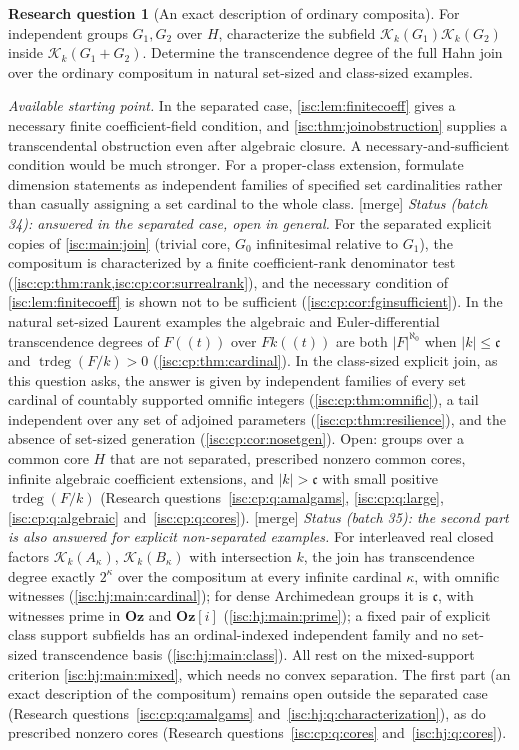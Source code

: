 \documentclass[11pt,letterpaper]{article}
\theoremstyle{definition}
\newtheorem{question}{Research question}
\theoremstyle{remark}
\newcommand{\Oz}{\mathbf{Oz}}
\newcommand{\K}[2]{\mathcal K_{#1}(#2)}
\newcommand{\trdeg}{\operatorname{trdeg}}
\newcommand{\mtag}{\textup{[merge]}}%
\newcommand{\cc}{\mathfrak c}
\numberwithin{equation}{section}
\begin{document}
\begin{question}[An exact description of ordinary composita]
For independent groups $G_1,G_2$ over $H$, characterize the subfield
$\K{k}{G_1}\K{k}{G_2}$ inside $\K{k}{G_1+G_2}$. Determine the
transcendence degree of the full Hahn join over the ordinary compositum in
natural set-sized and class-sized examples.
\end{question}
\noindent\emph{Available starting point.} In the separated case,
\cref{isc:lem:finitecoeff} gives a necessary finite coefficient-field condition,
and \cref{isc:thm:joinobstruction} supplies a transcendental obstruction even
after algebraic closure. A necessary-and-sufficient condition would be much
stronger. For a proper-class extension, formulate dimension statements as
independent families of specified set cardinalities rather than casually
assigning a set cardinal to the whole class.
\mtag{} \emph{Status (batch 34): answered in the separated case, open in
general.} For the separated explicit copies of \cref{isc:main:join} (trivial
core, $G_0$ infinitesimal relative to $G_1$), the compositum is
characterized by a finite coefficient-rank denominator test
(\cref{isc:cp:thm:rank,isc:cp:cor:surrealrank}), and the necessary condition
of \cref{isc:lem:finitecoeff} is shown not to be sufficient
(\cref{isc:cp:cor:fginsufficient}). In the natural set-sized Laurent
examples the algebraic and Euler-differential transcendence degrees of
$F((t))$ over $F k((t))$ are both $|F|^{\aleph_0}$ when $|k|\le\cc$ and
$\trdeg(F/k)>0$ (\cref{isc:cp:thm:cardinal}). In the class-sized explicit
join, as this question asks, the answer is given by independent families of
every set cardinal of countably supported omnific integers
(\cref{isc:cp:thm:omnific}), a tail independent over any set of adjoined
parameters (\cref{isc:cp:thm:resilience}), and the absence of set-sized
generation (\cref{isc:cp:cor:nosetgen}). Open: groups over a common core $H$
that are not separated, prescribed nonzero common cores, infinite algebraic
coefficient extensions, and $|k|>\cc$ with small positive $\trdeg(F/k)$
(Research questions~\ref{isc:cp:q:amalgams}, \ref{isc:cp:q:large},
\ref{isc:cp:q:algebraic} and~\ref{isc:cp:q:cores}).
\mtag{} \emph{Status (batch 35): the second part is also answered for
explicit non-separated examples.} For interleaved real closed factors
$\K{k}{A_\kappa}$, $\K{k}{B_\kappa}$ with intersection $k$, the join has
transcendence degree exactly $2^\kappa$ over the compositum at every
infinite cardinal $\kappa$, with omnific witnesses
(\cref{isc:hj:main:cardinal}); for dense Archimedean groups it is $\cc$,
with witnesses prime in $\Oz$ and $\Oz[i]$ (\cref{isc:hj:main:prime}); a
fixed pair of explicit class support subfields has an ordinal-indexed
independent family and no set-sized transcendence basis
(\cref{isc:hj:main:class}). All rest on the mixed-support criterion
\cref{isc:hj:main:mixed}, which needs no convex separation. The first part
(an exact description of the compositum) remains open outside the
separated case (Research questions~\ref{isc:cp:q:amalgams}
and~\ref{isc:hj:q:characterization}), as do prescribed nonzero cores
(Research questions~\ref{isc:cp:q:cores} and~\ref{isc:hj:q:cores}).
\end{document}

